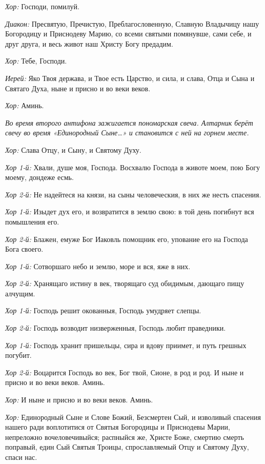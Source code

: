 \begin{mymulticols}
{\itshape Хор:} Господи, помилуй. 


{\itshape Диакон:} Пресвятую, Пречистую, Преблагословенную, Славную Владычицу нашу Богородицу и Приснодеву Марию, со всеми святыми помянувше, сами себе, и друг друга, и весь живот наш Христу Богу предадим. 


{\itshape Хор:} Тебе, Господи. 


{\itshape Иерей:} Яко Твоя держава, и Твое есть Царство, и сила, и слава, Отца и Сына и Святаго Духа, ныне и присно и во веки веков. 


{\itshape Хор:} Аминь. 



{\itshape Во время второго антифона зажигается пономарская свеча. Алтарник берёт свечу во время «Единородный Сыне…» и становится с ней на горнем месте.}

{\itshape Хор:} Слава Отцу, и Сыну, и Святому Духу. 


{\itshape Хор 1-й:} Хвали, душе моя, Господа. Восхвалю Господа в животе моем, пою Богу моему, дондеже есмь. 


{\itshape Хор 2-й:} Не надейтеся на князи, на сыны человеческия, в них же несть спасения. 


{\itshape Хор 1-й:} Изыдет дух его, и возвратится в землю свою: в той день погибнут вся помышления его. 


{\itshape Хор 2-й:} Блажен, емуже Бог Иаковль помощник его, упование его на Господа Бога своего. 


{\itshape Хор 1-й:} Сотворшаго небо и землю, море и вся, яже в них. 


{\itshape Хор 2-й:} Хранящаго истину в век, творящаго суд обидимым, дающаго пищу алчущим. 


{\itshape Хор 1-й:} Господь решит окованныя, Господь умудряет слепцы. 


{\itshape Хор 2-й:} Господь возводит низверженныя, Господь любит праведники. 


{\itshape Хор 1-й:} Господь хранит пришельцы, сира и вдову приимет, и путь грешных погубит. 


{\itshape Хор 2-й:} Воцарится Господь во век, Бог твой, Сионе, в род и род. И ныне и присно и во веки веков. Аминь. 

{\itshape Хор:} И ныне и присно и во веки веков. Аминь. 



{\itshape Хор:} Единородный Сыне и Слове Божий, Безсмертен Сый, и изволивый спасения нашего ради воплотитися от Святыя Богородицы и Приснодевы Марии, непреложно вочеловечивыйся; распныйся же, Христе Боже, смертию смерть поправый, един Сый Святыя Троицы, спрославляемый Отцу и Святому Духу, спаси нас. 



\end{mymulticols}

